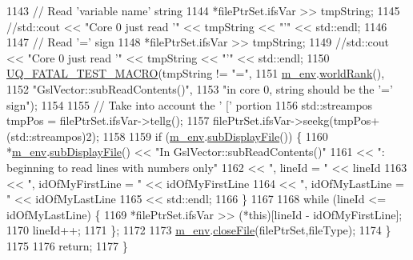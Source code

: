 \begin{DoxyCode}
1143     \textcolor{comment}{// Read 'variable name' string}
1144     *filePtrSet.ifsVar >> tmpString;
1145     \textcolor{comment}{//std::cout << "Core 0 just read '" << tmpString << "'" << std::endl;}
1146 
1147     \textcolor{comment}{// Read '=' sign}
1148     *filePtrSet.ifsVar >> tmpString;
1149     \textcolor{comment}{//std::cout << "Core 0 just read '" << tmpString << "'" << std::endl;}
1150     \hyperlink{_defines_8h_a56d63d18d0a6d45757de47fcc06f574d}{UQ\_FATAL\_TEST\_MACRO}(tmpString != \textcolor{stringliteral}{"="},
1151                         \hyperlink{class_q_u_e_s_o_1_1_vector_ae7615172bb1e54339151d3f3d71a0344}{m\_env}.\hyperlink{class_q_u_e_s_o_1_1_base_environment_a78b57112bbd0e6dd0e8afec00b40ffa7}{worldRank}(),
1152                         \textcolor{stringliteral}{"GslVector::subReadContents()"},
1153                         \textcolor{stringliteral}{"in core 0, string should be the '=' sign"});
1154 
1155     \textcolor{comment}{// Take into account the ' [' portion}
1156     std::streampos tmpPos = filePtrSet.ifsVar->tellg();
1157     filePtrSet.ifsVar->seekg(tmpPos+(std::streampos)2);
1158 
1159     \textcolor{keywordflow}{if} (\hyperlink{class_q_u_e_s_o_1_1_vector_ae7615172bb1e54339151d3f3d71a0344}{m\_env}.\hyperlink{class_q_u_e_s_o_1_1_base_environment_a8a0064746ae8dddfece4229b9ad374d6}{subDisplayFile}()) \{
1160       *\hyperlink{class_q_u_e_s_o_1_1_vector_ae7615172bb1e54339151d3f3d71a0344}{m\_env}.\hyperlink{class_q_u_e_s_o_1_1_base_environment_a8a0064746ae8dddfece4229b9ad374d6}{subDisplayFile}() << \textcolor{stringliteral}{"In GslVector::subReadContents()"}
1161                               << \textcolor{stringliteral}{": beginning to read lines with numbers only"}
1162                               << \textcolor{stringliteral}{", lineId = "} << lineId
1163                               << \textcolor{stringliteral}{", idOfMyFirstLine = "} << idOfMyFirstLine
1164                               << \textcolor{stringliteral}{", idOfMyLastLine = "} << idOfMyLastLine
1165                               << std::endl;
1166     \}
1167 
1168     \textcolor{keywordflow}{while} (lineId <= idOfMyLastLine) \{
1169       *filePtrSet.ifsVar >> (*this)[lineId - idOfMyFirstLine];
1170       lineId++;
1171     \};
1172 
1173     \hyperlink{class_q_u_e_s_o_1_1_vector_ae7615172bb1e54339151d3f3d71a0344}{m\_env}.\hyperlink{class_q_u_e_s_o_1_1_base_environment_ab712bff194ddd91459d4ea8715c77e8b}{closeFile}(filePtrSet,fileType);
1174   \}
1175 
1176   \textcolor{keywordflow}{return};
1177 \}
\end{DoxyCode}
